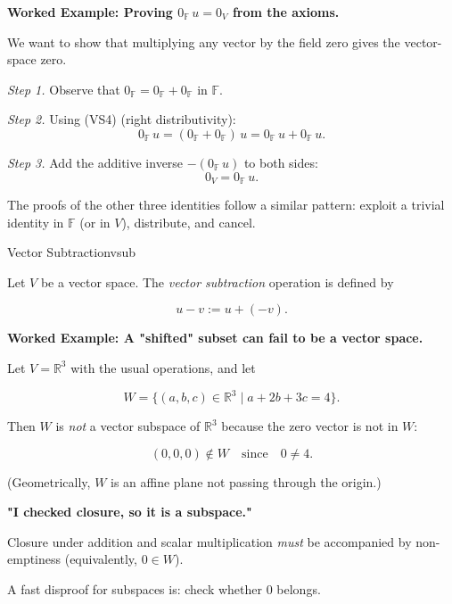 \begin{examplebox}
\textbf{Worked Example: Proving $0_{\mathbb{F}}\,u = 0_V$ from the axioms.}

We want to show that multiplying any vector by the field zero gives the vector-space zero.

\emph{Step 1.}  Observe that $0_{\mathbb{F}} = 0_{\mathbb{F}} + 0_{\mathbb{F}}$ in $\mathbb{F}$.

\emph{Step 2.}  Using (VS4) (right distributivity):
\[
0_{\mathbb{F}}\,u = (0_{\mathbb{F}}+0_{\mathbb{F}})\,u = 0_{\mathbb{F}}\,u + 0_{\mathbb{F}}\,u.
\]

\emph{Step 3.}  Add the additive inverse $-(0_{\mathbb{F}}\,u)$ to both sides:
\[
0_V = 0_{\mathbb{F}}\,u.
\]

The proofs of the other three identities follow a similar pattern: exploit a trivial identity in $\mathbb{F}$ (or in $V$), distribute, and cancel.
\end{examplebox}

\begin{definition}{Vector Subtraction}{vsub}

Let $V$ be a vector space. The \emph{vector subtraction} operation is defined by

\[
u - v := u + (-v).
\]

\end{definition}

\begin{examplebox}

\textbf{Worked Example: A "shifted" subset can fail to be a vector space.}

Let $V=\mathbb{R}^3$ with the usual operations, and let

\[
W=\{(a,b,c)\in\mathbb{R}^3 \mid a+2b+3c=4\}.
\]

Then $W$ is \emph{not} a vector subspace of $\mathbb{R}^3$ because the zero vector is not in $W$:

\[
(0,0,0)\notin W \quad\text{since}\quad 0\neq 4.
\]

(Geometrically, $W$ is an affine plane not passing through the origin.)

\end{examplebox}

\begin{commonmistake}

\textbf{"I checked closure, so it is a subspace."}

Closure under addition and scalar multiplication \emph{must} be accompanied by non-emptiness (equivalently, $0\in W$).

A fast disproof for subspaces is: check whether $0$ belongs.

\end{commonmistake}

